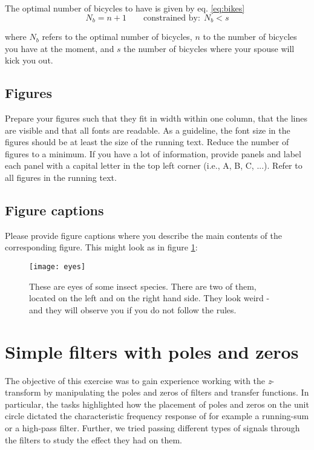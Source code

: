 \documentclass[journal]{IEEEtran}
\begin{document}
The optimal number of bicycles to have is given by eq. \ref{eq:bikes}
\begin{equation}\label{eq:bikes}
 N_b = n + 1 \qquad \mbox{constrained by:} \ \ N_b < s
\end{equation}

where $N_b$ refers to the optimal number of bicycles, $n$ to the number of bicycles you have at the moment, and $s$ the number of bicycles where your spouse will kick you out.


\subsection{Figures}
Prepare your figures such that they fit in width within one column, that the lines are visible and that all fonts are readable. As a guideline, the font size in the figures should be at least the size of the running text. Reduce the number of figures to a minimum. If you have a lot of information, provide panels and label each panel with a capital letter in the top left corner (i.e., A, B, C, ...). Refer to all figures in the running text.  

\subsection{Figure captions}
Please provide figure captions where you describe the main contents of the corresponding figure. This might look as in figure \ref{fig:eyes}:
\begin{figure}
 \texttt{[image: eyes]}
 \caption{These are eyes of some insect species. There are two of them, located on the left and on the right hand side. They look weird - and they will observe you if you do not follow the rules.}
 \label{fig:eyes}
\end{figure}


\newpage
\section{Simple filters with poles and zeros}
The objective of this exercise was to gain experience working with the \textit{z}-transform by manipulating the poles and zeros of filters and transfer functions. In particular, the tasks highlighted how the placement of poles and zeros on the unit circle dictated the characteristic frequency response of for example a running-sum or a high-pass filter. Further, we tried passing different types of signals through the filters to study the effect they had on them. 
\end{document}
